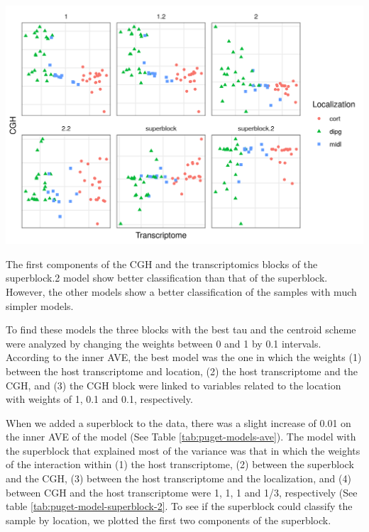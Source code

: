 \documentclass[
  a4paper,
]{book}
\let\origfigure\figure
\let\endorigfigure\endfigure
\renewenvironment{figure}[1][2] {
    \expandafter\origfigure\expandafter[!ht]
} {
    \endorigfigure
}
\begin{document}
\begin{figure}
\includegraphics[width=1\linewidth]{images/pugets_models} \caption[Different models tried with the same data showing the first components of the CGH data and the transcriptome.]{Different models tried with the same data showing the first components of the CGH data and the transcriptome. Model 1 and 1.2 with transcriptomics, CGH data and all the data about the samples together. Model 2 and 2.2 with transcriptomics, CGH data and all the data bout the samples on different blocks. Model superblock and superblock.2 have all the data in different blokcs and one block with all the data.}\label{fig:puget-models}
\end{figure}

The first components of the CGH and the transcriptomics blocks of the superblock.2 model show better classification than that of the superblock.
However, the other models show a better classification of the samples with much simpler models.

To find these models the three blocks with the best tau and the centroid scheme were analyzed by changing the weights between 0 and 1 by 0.1 intervals.
According to the inner AVE, the best model was the one in which the weights (1) between the host transcriptome and location, (2) the host transcriptome and the CGH, and (3) the CGH block were linked to variables related to the location with weights of 1, 0.1 and 0.1, respectively.

When we added a superblock to the data, there was a slight increase of 0.01 on the inner AVE of the model (See Table \ref{tab:puget-models-ave}).
The model with the superblock that explained most of the variance was that in which the weights of the interaction within (1) the host transcriptome, (2) between the superblock and the CGH, (3) between the host transcriptome and the localization, and (4) between CGH and the host transcriptome were 1, 1, 1 and 1/3, respectively (See table \ref{tab:puget-model-superblock-2}.
To see if the superblock could classify the sample by location, we plotted the first two components of the superblock.
\end{document}
